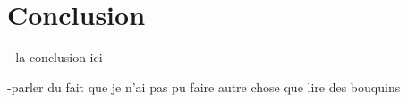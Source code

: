 
\chapter*{Conclusion}

- la conclusion ici-

-parler du fait que je n'ai pas pu faire autre chose que lire des bouquins
